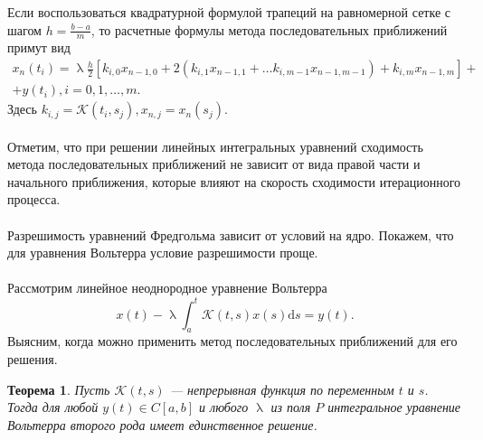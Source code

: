 \documentclass[a4paper, 12pt]{report}
\renewcommand{\lambda}{\uplambda}
\newtheorem*{theorem}{Теорема}
\begin{document}
		Если воспользоваться квадратурной формулой трапеций на равномерной сетке с шагом $h=\frac{b-a}{m}$, то расчетные формулы метода последовательных приближений примут вид
		$$
		\begin{gathered}
			x_{n}\left(t_{i}\right)=\lambda \frac{h}{2}\left[k_{i, 0} x_{n-1,0}+2\left(k_{i, 1} x_{n-1,1}+\ldots k_{i, m-1} x_{n-1, m-1}\right)+k_{i, m} x_{n-1, m}\right]+ \\
			+y\left(t_{i}\right), i=0,1, \ldots, m .
		\end{gathered}
		$$
		Здесь $k_{i, j}=\mathcal{K}\left(t_{i}, s_{j}\right), x_{n, j}=x_{n}\left(s_{j}\right)$.
		\\\\
		Отметим, что при решении линейных интегральных уравнений сходимость метода последовательных приближений не зависит от вида правой части и начального приближения, которые влияют на скорость сходимости итерационного процесса.
		\\\\
		Разрешимость уравнений Фредгольма зависит от условий на ядро. Покажем, что для уравнения Вольтерра условие разрешимости проще.\\\\
		Рассмотрим линейное неоднородное уравнение Вольтерра
		$$
		x(t)-\lambda \int_{a}^{t} \mathcal{K}(t, s) x(s) \mathrm{d} s=y(t) .
		$$
		Выясним, когда можно применить метод последовательных приближений для его решения.
		\begin{theorem}
			Пусть $\mathcal{K}(t, s)$ --- непрерывная функция по переменным $t$ и $s$. Тогда для любой $y(t) \in C[a, b]$ и любого $\lambda$ из поля $P$ интегральное уравнение Вольтерра второго рода имеет единственное решение.
		\end{theorem}
\end{document}
